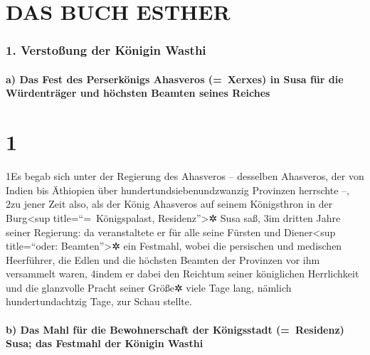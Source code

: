 \hypertarget{das-buch-esther}{%
\section{DAS BUCH ESTHER}\label{das-buch-esther}}

\hypertarget{verstouxdfung-der-kuxf6nigin-wasthi}{%
\subsubsection{1. Verstoßung der Königin
Wasthi}\label{verstouxdfung-der-kuxf6nigin-wasthi}}

\hypertarget{a-das-fest-des-perserkuxf6nigs-ahasveros-xerxes-in-susa-fuxfcr-die-wuxfcrdentruxe4ger-und-huxf6chsten-beamten-seines-reiches}{%
\paragraph{a) Das Fest des Perserkönigs Ahasveros (=~Xerxes) in Susa für
die Würdenträger und höchsten Beamten seines
Reiches}\label{a-das-fest-des-perserkuxf6nigs-ahasveros-xerxes-in-susa-fuxfcr-die-wuxfcrdentruxe4ger-und-huxf6chsten-beamten-seines-reiches}}

\hypertarget{section}{%
\section{1}\label{section}}

1Es begab sich unter der Regierung des Ahasveros -- desselben Ahasveros,
der von Indien bis Äthiopien über hundertundsiebenundzwanzig Provinzen
herrschte --, 2zu jener Zeit also, als der König Ahasveros auf seinem
Königsthron in der Burg\textless sup title=``=~Königspalast,
Residenz''\textgreater✲ Susa saß, 3im dritten Jahre seiner Regierung: da
veranstaltete er für alle seine Fürsten und Diener\textless sup
title=``oder: Beamten''\textgreater✲ ein Festmahl, wobei die persischen
und medischen Heerführer, die Edlen und die höchsten Beamten der
Provinzen vor ihm versammelt waren, 4indem er dabei den Reichtum seiner
königlichen Herrlichkeit und die glanzvolle Pracht seiner Größe✲ viele
Tage lang, nämlich hundertundachtzig Tage, zur Schau stellte.

\hypertarget{b-das-mahl-fuxfcr-die-bewohnerschaft-der-kuxf6nigsstadt-residenz-susa-das-festmahl-der-kuxf6nigin-wasthi}{%
\paragraph{b) Das Mahl für die Bewohnerschaft der Königsstadt
(=~Residenz) Susa; das Festmahl der Königin
Wasthi}\label{b-das-mahl-fuxfcr-die-bewohnerschaft-der-kuxf6nigsstadt-residenz-susa-das-festmahl-der-kuxf6nigin-wasthi}}

